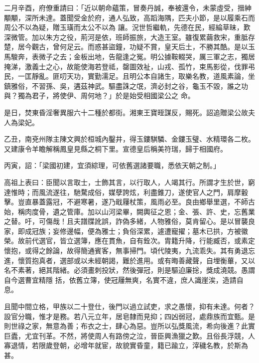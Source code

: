 \begin{pinyinscope}
 二月辛酉，府僚重請曰：「近以朝命蘊策，冒奏丹誠，奉被還令，未蒙虛受，搢紳顒顒，深所未達。蓋聞受金於府，通人弘致，高蹈海隅，匹夫小節，是以履乘石而周公不以為疑，贈玉璜而太公不以為
 讓。況世哲繼軌，先德在民，經綸草昧，歎深微管。加以朱方之役，荊河是依，班師振旅，大造王室。雖復累繭救宋，重胝存楚，居今觀古，曾何足云。而惑甚盜鐘，功疑不賞，皇天后土，不勝其酷。是以玉馬駿奔，表微子之去；金板出地，告龍逢之冤。明公據鞍輟哭，厲三軍之志，獨居掩涕，激義士之心，故能使海若登祗，罄圖效祉，山戎、孤竹，束馬影從，伐罪弔民，一匡靜亂。匪叨天功，實勤濡足。且明公本自諸生，取樂名教，道風素論，坐鎮雅俗，不習孫、吳，遘茲神武。驅盡誅之氓，濟必封之谷，龜玉不毀，誰之功與？獨為君子，將使伊、周何地？」於是始受相國梁公之
 命。



 是日，焚東昏淫奢異服六十二種於都街。湘東王寶晊謀反，賜死。詔追贈梁公故夫人為梁妃。



 乙丑，南兗州隊主陳文興於桓城內鑿井，得玉鏤騏驎、金鏤玉璧、水精環各二枚。又建康令羊瞻解稱鳳皇見縣之桐下里。宣德皇后稱美符瑞，歸于相國府。



 丙寅，詔：「梁國初建，宜須綜理，可依舊選諸要職，悉依天朝之制。」



 高祖上表曰：臣聞以言取士，士飾其言，以行取人，人竭其行。所謂才生於世，窮達惟時；而風流遂往，馳騖成俗，媒孽誇炫，利盡錐刀，遂使官人之門，肩摩轂擊。豈直暴蓋露冠，不避寒暑，遂乃戢屨杖策，風雨必至。良由鄉舉里選，不師古
 始，稱肉度骨，遺之管庫。加以山河梁畢，闕輿征之恩；金、張、許、史，忘舊業之替。吁，可傷哉！且夫譜牒訛誤，詐偽多緒，人物雅俗，莫肯留心。是以冒襲良家，即成冠族；妄修邊幅，便為雅士；負俗深累，遽遭寵擢；墓木已拱，方被徽榮。故前代選官，皆立選簿，應在貫魚，自有銓次。胄籍升降，行能臧否，或素定懷抱，或得之餘論，故得簡通賓客，無事掃門。頃代陵夷，九流乖失。其有勇退忘進，懷質抱真者，選部或以未經朝謁，難於進用。或有晦善藏聲，自埋衡蓽，又以名不素著，絕其階緒。必須畫刺投狀，然後彈冠，則是驅迫廉捴，獎成澆競。愚謂自今選曹宜精隱
 括，依舊立簿，使冠屨無爽，名實不違，庶人識崖涘，造請自息。



 且聞中間立格，甲族以二十登仕，後門以過立試吏，求之愚懷，抑有未達。何者？設官分職，惟才是務。若八元立年，居皂隸而見抑；四凶弱冠，處鼎族而宜甄。是則世祿之家，無意為善；布衣之士，肆心為惡。豈所以弘獎風流，希向後進？此實巨蠹，尤宜刊革。不然，將使周人有路傍之泣，晉臣興漁獵之歎。且俗長浮競，人寡退情，若限歲登朝，必增年就宦，故貌實昏童，籍已踰立，滓穢名教，於斯為甚。




\end{pinyinscope}
